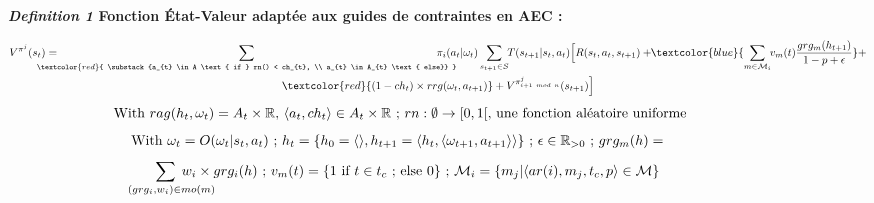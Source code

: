 \begin{figure}[h!]
  \label{eq:single_value_function}
  \raggedright
  \textbf{\textit{Definition 1} \quad Fonction État-Valeur adaptée aux guides de contraintes en AEC :}

  \begin{scriptsize}
    \vspace{-0.6cm}
    \begin{gather*}
      V^{\pi^j}(s_t) = \hspace{-0.75cm}
      \sum_{\textcolor{red}{ \substack{a_{t} \in A \text{ if } rn() < ch_{t}, \\
            a_{t} \in A_{t} \text{ else}}
        }}{\hspace{-0.7cm} \pi_i(a_{t} | \omega_t)}
      \sum_{s_{t+1} \in S}
      {\hspace{-0.1cm} T(s_{t+1} | s_t, a_{t})
      \Bigl[R(s_t,a_{t},s_{t+1}) + \hspace{-0.1cm}
      \textcolor{blue}{ \sum_{m \in \mathcal{M}_i}{ \hspace{-0.1cm} v_m(t) \frac{grg_m(h_{t+1})}{1 - p + \epsilon} } }
      + } \\
      {\textcolor{red}{(1-ch_t) \times rrg(\omega_t,a_{t+1})} + V^{\pi^j_{i+1 \ mod \ n}}(s_{t+1})\Bigr]}
    \end{gather*}
    \vspace{-0.5cm}
    \textcolor{red}{\[\text{ \hspace{-0.1cm} With } rag(h_t, \omega_t) = A_{t} \times \mathbb{R} \text{, } \langle a_t, ch_{t} \rangle \in A_{t} \times \mathbb{R} \text{ ; } rn: \emptyset \to [0,1[ \text{, une fonction aléatoire uniforme}\]}
    \vspace{-0.6cm}
    \textcolor{blue}{
      \begin{gather*}
        \hspace{-0.001cm}
        \text{With } \omega_t = O(\omega_t | s_t, a_t) \text{ ; } h_t = \{h_0 = \langle \rangle, h_{t+1} = \langle h_t, \langle \omega_{t+1}, a_{t+1} \rangle \rangle \} \text{ ; } \epsilon \in \mathbb{R}_{>0} \text{ ; } grg_m(h) =
      \end{gather*}
    }
    \vspace{-0.95cm}
    \textcolor{blue}{
      \begin{gather*}
        \hspace{-0.5cm} \sum_{\hspace{0.3cm}(grg_i,w_i) \in mo(m)}{\hspace{-0.9cm} w_i \times grg_i(h)}
        \text{ ; } v_m(t) = \{ 1 \text{ if } t \in t_c \text{ ; else } 0 \} \text{ ; } \mathcal{M}_i = \{m_j | \langle ar(i),m_j,t_c,p \rangle \in \mathcal{M}\}
      \end{gather*}
    }
    \vspace{-0.6cm}
  \end{scriptsize}

\end{figure}

